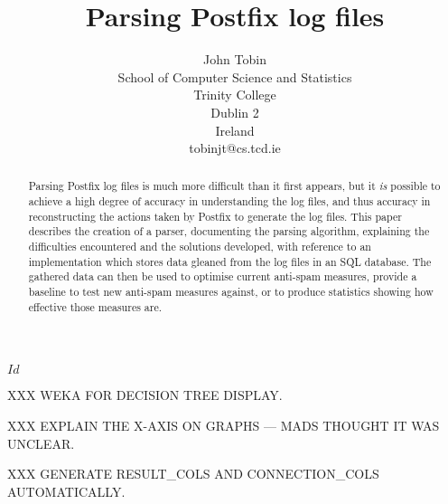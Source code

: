 \documentclass[a4paper,12pt,draft]{article}
\newcounter{dummy}
\begin{document}




\title{Parsing Postfix log files}
\author{John Tobin \\ School of Computer Science and Statistics \\
Trinity College \\ Dublin 2 \\ Ireland \\ tobinjt@cs.tcd.ie}
\maketitle
\SVN$Id$
\begin{center}\SVNId{}\end{center}

\begin{abstract}

    Parsing Postfix log files is much more difficult than it first appears,
    but it \textit{is\/} possible to achieve a high degree of accuracy in
    understanding the log files, and thus accuracy in reconstructing the
    actions taken by Postfix to generate the log files.  This paper
    describes the creation of a parser, documenting the parsing algorithm,
    explaining the difficulties encountered and the solutions developed,
    with reference to an implementation which stores data gleaned from the
    log files in an SQL database.  The gathered data can then be used to
    optimise current anti-spam measures, provide a baseline to test new
    anti-spam measures against, or to produce statistics showing how
    effective those measures are.

\end{abstract}

XXX WEKA FOR DECISION TREE DISPLAY\@.

XXX EXPLAIN THE X-AXIS ON GRAPHS --- MADS THOUGHT IT WAS UNCLEAR\@.

XXX GENERATE RESULT\_COLS AND CONNECTION\_COLS AUTOMATICALLY\@.

\newpage
\tableofcontents
\listoffigures
\listoftables

\newpage








\end{document}
